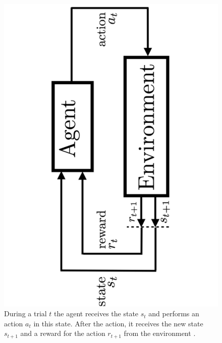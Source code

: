 \begin{figure}[htp!]
    \centering
    \includegraphics[angle=-90,width=.5\textwidth]{./fig/rl-diagram.pdf}
    \caption{During a trial $t$ the agent receives the state $s_t$ and
    performs an action $a_t$ in this state. After the action, it receives
    the new state $s_{t+1}$ and a reward for the action $r_{t+1}$ from the
    environment \protect\cite{rafati2019}.}
    \label{rl-diagram}
\end{figure}
